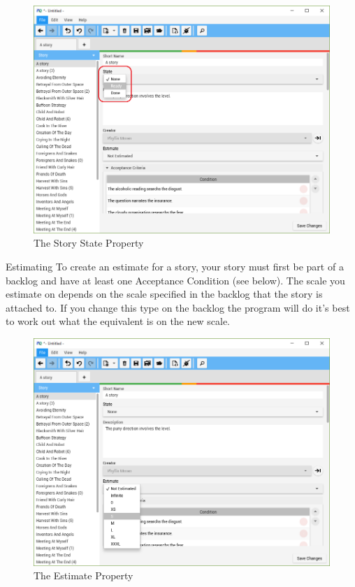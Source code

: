 \begin{figure}[H]
\centering
\includegraphics[width=\textwidth]{images/screenshots/Readiness1.PNG}
\caption{The Story State Property}
\label{fig:new_project}
\end{figure}

Estimating\newline
To create an estimate for a story, your story must first be part of a backlog and have at least one Acceptance Condition (see below). The scale you estimate on depends on the scale specified in the backlog that the story is attached to. If you change this type on the backlog the program will do it's best to work out what the equivalent is on the new scale.

\begin{figure}[H]
\centering
\includegraphics[width=\textwidth]{images/screenshots/Estimate1.PNG}
\caption{The Estimate Property}
\label{fig:new_project}
\end{figure}

